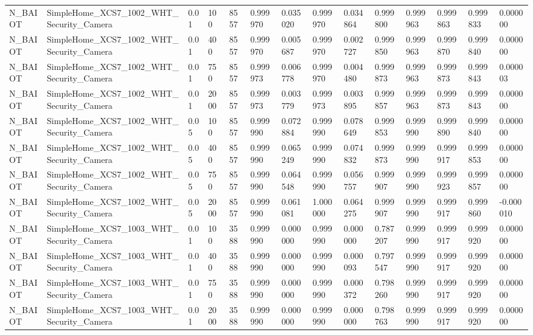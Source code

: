 \begin{tabular}{llllllllllllll}
N\_BAIOT & SimpleHome\_XCS7\_1002\_WHT\_Security\_Camera & 0.01 & 100 & 8557 & 0.999970 & 0.035020 & 0.999970 & 0.034864 & 0.999800 & 0.999963 & 0.999863 & 0.999833 & 0.000000 \\
N\_BAIOT & SimpleHome\_XCS7\_1002\_WHT\_Security\_Camera & 0.01 & 400 & 8557 & 0.999970 & 0.005687 & 0.999970 & 0.002727 & 0.999850 & 0.999963 & 0.999870 & 0.999840 & 0.000000 \\
N\_BAIOT & SimpleHome\_XCS7\_1002\_WHT\_Security\_Camera & 0.01 & 750 & 8557 & 0.999973 & 0.006778 & 0.999970 & 0.004480 & 0.999873 & 0.999963 & 0.999873 & 0.999843 & 0.000003 \\
N\_BAIOT & SimpleHome\_XCS7\_1002\_WHT\_Security\_Camera & 0.01 & 2000 & 8557 & 0.999973 & 0.003779 & 0.999973 & 0.003895 & 0.999857 & 0.999963 & 0.999873 & 0.999843 & 0.000000 \\
N\_BAIOT & SimpleHome\_XCS7\_1002\_WHT\_Security\_Camera & 0.05 & 100 & 8557 & 0.999990 & 0.072884 & 0.999990 & 0.078649 & 0.999853 & 0.999990 & 0.999890 & 0.999840 & 0.000000 \\
N\_BAIOT & SimpleHome\_XCS7\_1002\_WHT\_Security\_Camera & 0.05 & 400 & 8557 & 0.999990 & 0.065249 & 0.999990 & 0.074832 & 0.999873 & 0.999990 & 0.999917 & 0.999853 & 0.000000 \\
N\_BAIOT & SimpleHome\_XCS7\_1002\_WHT\_Security\_Camera & 0.05 & 750 & 8557 & 0.999990 & 0.064548 & 0.999990 & 0.056757 & 0.999907 & 0.999990 & 0.999923 & 0.999857 & 0.000000 \\
N\_BAIOT & SimpleHome\_XCS7\_1002\_WHT\_Security\_Camera & 0.05 & 2000 & 8557 & 0.999990 & 0.061081 & 1.000000 & 0.064275 & 0.999907 & 0.999990 & 0.999917 & 0.999860 & -0.000010 \\
N\_BAIOT & SimpleHome\_XCS7\_1003\_WHT\_Security\_Camera & 0.01 & 100 & 3588 & 0.999990 & 0.000000 & 0.999990 & 0.000000 & 0.787207 & 0.999990 & 0.999917 & 0.999920 & 0.000000 \\
N\_BAIOT & SimpleHome\_XCS7\_1003\_WHT\_Security\_Camera & 0.01 & 400 & 3588 & 0.999990 & 0.000000 & 0.999990 & 0.000093 & 0.797547 & 0.999990 & 0.999917 & 0.999920 & 0.000000 \\
N\_BAIOT & SimpleHome\_XCS7\_1003\_WHT\_Security\_Camera & 0.01 & 750 & 3588 & 0.999990 & 0.000000 & 0.999990 & 0.000372 & 0.798260 & 0.999990 & 0.999917 & 0.999920 & 0.000000 \\
N\_BAIOT & SimpleHome\_XCS7\_1003\_WHT\_Security\_Camera & 0.01 & 2000 & 3588 & 0.999990 & 0.000000 & 0.999990 & 0.000000 & 0.798763 & 0.999990 & 0.999917 & 0.999920 & 0.000000 \\

\end{tabular}
